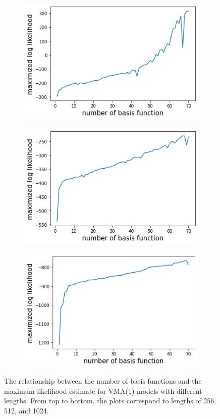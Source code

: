 \documentclass[%
 reprint,
 amsmath,amssymb,
 aps,
]{revtex4-2}
\begin{document}
\begin{figure}
\centering
\begin{subfigure}{\textwidth} %
  \centering
  \includegraphics[width=10cm]{num basis funs vs mle vma1 256.png}
\end{subfigure}

\begin{subfigure}{\textwidth} %
  \centering
  \includegraphics[width=10cm]{num basis funs vs mle vma1 512.png}
\end{subfigure}

\begin{subfigure}{\textwidth} %
  \centering
  \includegraphics[width=10cm]{num basis funs vs mle vma1 1024.png}
\end{subfigure}
\caption{The relationship between the number of basis functions and the maximum likelihood estimate for VMA(1) models with different lengths. From top to bottom, the plots correspond to lengths of 256, 512, and 1024.}
\label{vma1 basis funs vs mle}
\end{figure}
\end{document}
